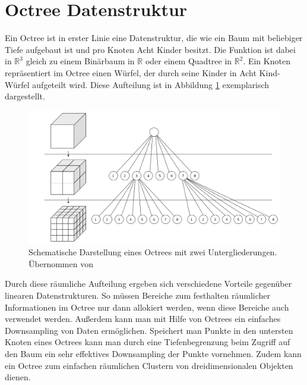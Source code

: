 \section{Octree Datenstruktur}

Ein Octree ist in erster Linie eine Datenstruktur, die wie ein Baum mit beliebiger Tiefe aufgebaut ist und pro Knoten Acht Kinder besitzt. Die Funktion ist dabei in \(\mathbb{R}^3\) gleich zu einem Binärbaum in \(\mathbb{R}\) oder einem Quadtree in \(\mathbb{R}^2\). Ein Knoten repräsentiert im Octree einen Würfel, der durch seine Kinder in Acht Kind-Würfel aufgeteilt wird. Diese Aufteilung ist in Abbildung \ref{fig:octree} exemplarisch dargestellt.\\

\begin{figure}[h]
  \centering
	\includegraphics[width=1.0\textwidth]{content/images/theory/octree.png} 
  \caption{Schematische Darstellung eines Octrees mit zwei Untergliederungen. Übernommen von \citet{dumusc2011multi}}
  \label{fig:octree}
\end{figure}

Durch diese räumliche Aufteilung ergeben sich verschiedene Vorteile gegenüber linearen Datenstrukturen. So müssen Bereiche zum festhalten räumlicher Informationen im Octree nur dann allokiert werden, wenn diese Bereiche auch verwendet werden. Außerdem kann man mit Hilfe von Octrees ein einfaches Downsampling von Daten ermöglichen. Speichert man Punkte in den untersten Knoten eines Octrees kann man durch eine Tiefenbegrenzung beim Zugriff auf den Baum ein sehr effektives Downsampling der Punkte vornehmen. Zudem kann ein Octree zum einfachen räumlichen Clustern von dreidimensionalen Objekten dienen.\\